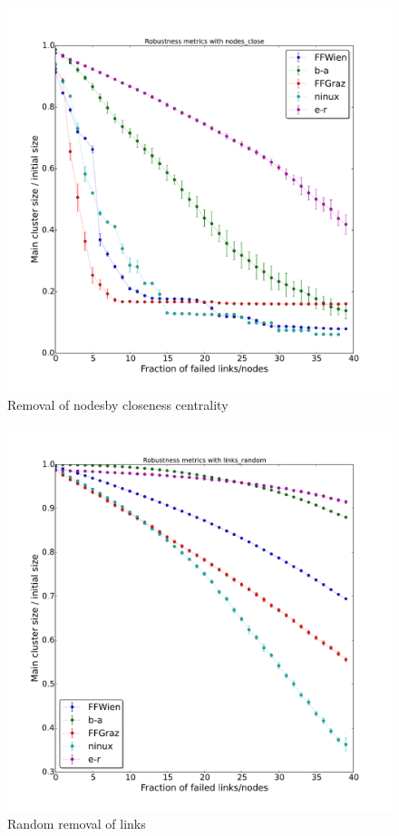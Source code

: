 \documentclass[a4paper,11pt,twoside,openleft]{memoir}
\begin{document}
\begin{figure}[htbp]
\centering
\includegraphics{graphs/nodes_close_robustness}
\caption{Removal of nodesby closeness centrality}
\label{fig:node_close}
\end{figure}

\begin{figure}[htbp]
\centering
\includegraphics{graphs/links_random_robustness}
\caption{Random removal of links}
\label{fig:link_rand}
\end{figure}
\end{document}
